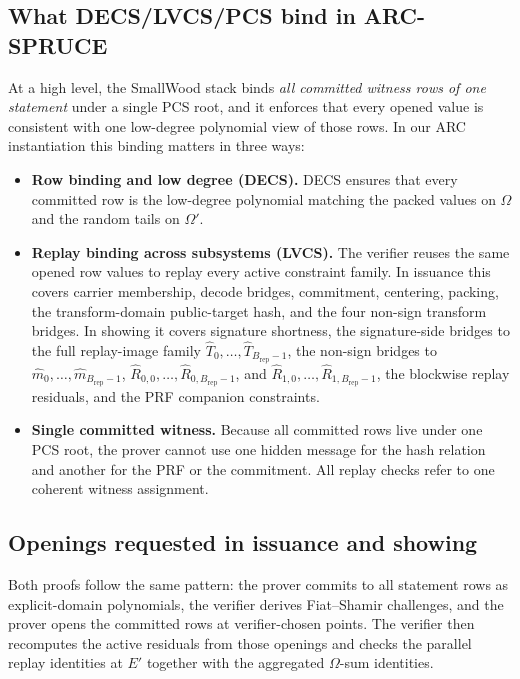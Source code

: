 \subsection{What DECS/LVCS/PCS bind in ARC-SPRUCE}
\label{app:smallwood-binds}
At a high level, the SmallWood stack binds \emph{all committed witness rows of
one statement} under a single PCS root, and it enforces that every opened value
is consistent with one low-degree polynomial view of those rows. In our ARC
instantiation this binding matters in three ways:
\begin{itemize}[leftmargin=1.25em]
  \item \textbf{Row binding and low degree (DECS).}
  DECS ensures that every committed row is the low-degree polynomial matching
  the packed values on \(\Omega\) and the random tails on \(\Omega'\).
  \item \textbf{Replay binding across subsystems (LVCS).}
  The verifier reuses the same opened row values to replay every active
  constraint family. In issuance this covers carrier membership, decode
  bridges, commitment, centering, packing, the transform-domain public-target
  hash, and the four non-sign transform bridges. In showing it covers
  signature shortness, the signature-side bridges to the full replay-image
  family \(\widehat T_0,\ldots,\widehat T_{B_{\mathrm{rep}}-1}\), the
  non-sign bridges to
  \(\widehat m_0,\ldots,\widehat m_{B_{\mathrm{rep}}-1}\),
  \(\widehat R_{0,0},\ldots,\widehat R_{0,B_{\mathrm{rep}}-1}\), and
  \(\widehat R_{1,0},\ldots,\widehat R_{1,B_{\mathrm{rep}}-1}\), the blockwise
  replay residuals, and the PRF companion constraints.
  \item \textbf{Single committed witness.}
  Because all committed rows live under one PCS root, the prover cannot use one
  hidden message for the hash relation and another for the PRF or the
  commitment. All replay checks refer to one coherent witness assignment.
\end{itemize}

\subsection{Openings requested in issuance and showing}
\label{app:smallwood-openings}
Both proofs follow the same pattern: the prover commits to all statement rows
as explicit-domain polynomials, the verifier derives Fiat--Shamir challenges,
and the prover opens the committed rows at verifier-chosen points. The verifier
then recomputes the active residuals from those openings and checks the
parallel replay identities at \(E'\) together with the aggregated
\(\Omega\)-sum identities.

